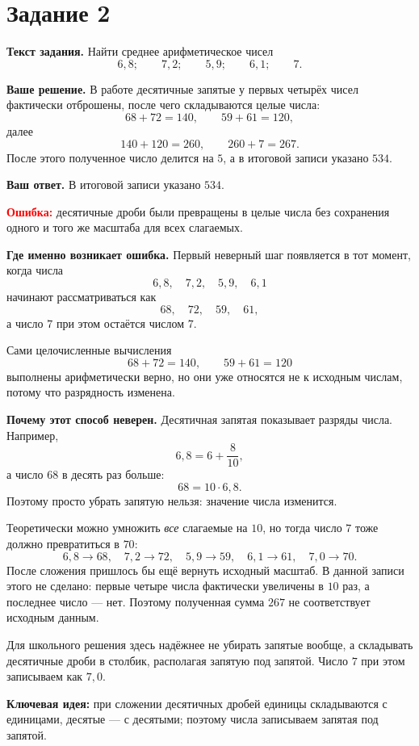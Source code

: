 \documentclass[12pt,a4paper]{article}
\begin{document}
\newpage
{}\label{task:2}
\section*{Задание 2}

\textbf{Текст задания.} Найти среднее арифметическое чисел
\[
6{,}8;\qquad
7{,}2;\qquad
5{,}9;\qquad
6{,}1;\qquad
7.
\]

\textbf{Ваше решение.}
В работе десятичные запятые у первых четырёх чисел фактически отброшены, после чего складываются целые числа:
\[
68+72=140,
\qquad
59+61=120,
\]
далее
\[
140+120=260,
\qquad
260+7=267.
\]
После этого полученное число делится на $5$, а в итоговой записи указано $534$.

\textbf{Ваш ответ.} В итоговой записи указано $534$.

\textcolor{red}{\textbf{Ошибка:}} десятичные дроби были превращены в целые числа без сохранения одного и того же масштаба для всех слагаемых.

\textbf{Где именно возникает ошибка.}
Первый неверный шаг появляется в тот момент, когда числа
\[
6{,}8,\quad 7{,}2,\quad 5{,}9,\quad 6{,}1
\]
начинают рассматриваться как
\[
68,\quad 72,\quad 59,\quad 61,
\]
а число $7$ при этом остаётся числом $7$.

Сами целочисленные вычисления
\[
68+72=140,\qquad 59+61=120
\]
выполнены арифметически верно, но они уже относятся не к исходным числам, потому что разрядность изменена.

\textbf{Почему этот способ неверен.}
Десятичная запятая показывает разряды числа. Например,
\[
6{,}8=6+\frac{8}{10},
\]
а число $68$ в десять раз больше:
\[
68=10\cdot6{,}8.
\]
Поэтому просто убрать запятую нельзя: значение числа изменится.

Теоретически можно умножить \emph{все} слагаемые на $10$, но тогда число $7$ тоже должно превратиться в $70$:
\[
6{,}8\to68,\quad
7{,}2\to72,\quad
5{,}9\to59,\quad
6{,}1\to61,\quad
7{,}0\to70.
\]
После сложения пришлось бы ещё вернуть исходный масштаб. В данной записи этого не сделано: первые четыре числа фактически увеличены в $10$ раз, а последнее число --- нет. Поэтому полученная сумма $267$ не соответствует исходным данным.

Для школьного решения здесь надёжнее не убирать запятые вообще, а складывать десятичные дроби в столбик, располагая запятую под запятой. Число $7$ при этом записываем как $7{,}0$.

\textcolor{blue!60!black}{\textbf{Ключевая идея:}} при сложении десятичных дробей единицы складываются с единицами, десятые --- с десятыми; поэтому числа записываем запятая под запятой.
\end{document}
